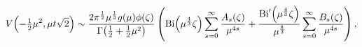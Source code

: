 \[\mathop{V\/}\nolimits\!\left(-\tfrac{1}{2}\mu^{2},\mu t\sqrt{2}\right)\sim%
\frac{2\pi^{\frac{1}{2}}\mu^{\frac{1}{3}}g(\mu)\phi(\zeta)}{\mathop{\Gamma\/}%
\nolimits\!\left(\tfrac{1}{2}+\tfrac{1}{2}\mu^{2}\right)}\*\left(\mathop{%
\mathrm{Bi}\/}\nolimits\!\left(\mu^{\frac{4}{3}}\zeta\right)\sum_{s=0}^{\infty%
}\frac{A_{s}(\zeta)}{\mu^{4s}}+\frac{\mathop{\mathrm{Bi}\/}\nolimits'\!\left(%
\mu^{\frac{4}{3}}\zeta\right)}{\mu^{\frac{8}{3}}}\sum_{s=0}^{\infty}\frac{B_{s%
}(\zeta)}{\mu^{4s}}\right),\]